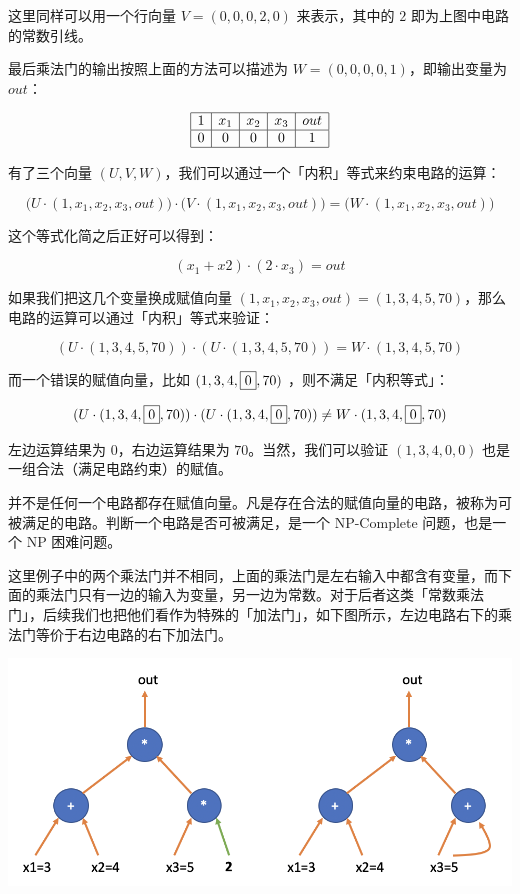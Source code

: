 这里同样可以用一个行向量 \(V=(0,0,0,2,0)\) 来表示，其中的 \(2\)
即为上图中电路的常数引线。

最后乘法门的输出按照上面的方法可以描述为 \(W=(0,0,0,0,1)\)，即输出变量为
\(out\)：

\[
\begin{array}{|c|c|c|c|c|}
\hline
1 & x_1 & x_2 & x_3 & out \\
\hline
0 & 0 & 0 & 0 & 1 \\
\hline
\end{array}
\]

有了三个向量 \((U,V,W)\)，我们可以通过一个「内积」等式来约束电路的运算：

\[
\big(U\cdot(1,x_1, x_2,x_3,out)\big) \cdot \big(V\cdot(1,x_1, x_2,x_3,out)\big) = \big(W\cdot(1,x_1, x_2,x_3,out)\big)
\]

这个等式化简之后正好可以得到：

\[
(x_1 + x2) \cdot (2\cdot x_3) = out
\]

如果我们把这几个变量换成赋值向量
\((1,x_1,x_2,x_3,out) = (1,3,4,5,70)\)，那么电路的运算可以通过「内积」等式来验证：

\[
(U\cdot(1,3,4,5,70))\cdot(U\cdot(1,3,4,5,70))=W\cdot(1,3,4,5,70)
\]

而一个错误的赋值向量，比如 \((1,3,4,\fbox{0},70)\)
，则不满足「内积等式」：

\[
(U\cdot(1,3,4,\fbox{0},70))\cdot(U\cdot(1,3,4,\fbox{0},70))\neq W\cdot(1,3,4,\fbox{0},70)
\]

左边运算结果为 \(0\)，右边运算结果为 \(70\)。当然，我们可以验证
\((1,3,4,0,0)\) 也是一组合法（满足电路约束）的赋值。

并不是任何一个电路都存在赋值向量。凡是存在合法的赋值向量的电路，被称为可被满足的电路。判断一个电路是否可被满足，是一个
NP-Complete 问题，也是一个 NP 困难问题。

这里例子中的两个乘法门并不相同，上面的乘法门是左右输入中都含有变量，而下面的乘法门只有一边的输入为变量，另一边为常数。对于后者这类「常数乘法门」，后续我们也把他们看作为特殊的「加法门」，如下图所示，左边电路右下的乘法门等价于右边电路的右下加法门。

\includegraphics{img/img20230423133455.png}

